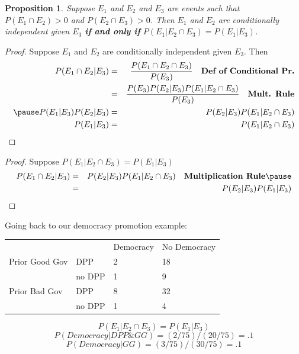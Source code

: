 \documentclass[aspectratio=169]{beamer}
\newtheorem{prop}{Proposition}
\numberwithin{equation}{section}
\begin{document}
\begin{frame}

\begin{prop}
Suppose $E_{1}$ and $E_{2}$ and $E_{3}$ are events such that $P(E_{1} \cap E_{2})>0$ and $P(E_{2} \cap E_{3}) >0$.  Then $E_{1}$ and $E_{2}$ are conditionally independent given $E_{3} $ \textbf{if and only if} $P(E_{1} | E_{2} \cap E_{3})  = P(E_{1} | E_{3}) $.  
\end{prop} \pause

\begin{proof}
Suppose $E_{1}$ and $E_{2}$ are conditionally independent given $E_{3}$.  Then 
\begin{eqnarray}
P(E_{1} \cap E_{2} |  E_{3}) & = & \frac{P(E_{1} \cap E_{2} \cap E_{3}  ) }{P(E_{3} )}  \quad \textbf{Def of Conditional Pr.}\nonumber \\
& = & \frac{P(E_{3})P(E_{2} | E_{3} )P(E_{1} | E_{2} \cap E_{3} ) }{ P(E_{3} )}  \quad \textbf{Mult. Rule} \nonumber \\\pause
P(E_{1}|E_{3}) P(E_{2} | E_{3} ) & = & P(E_{2} | E_{3} )P(E_{1} | E_{2} \cap E_{3} ) \nonumber \\
P(E_{1}|E_{3}) & = & P(E_{1} | E_{2} \cap E_{3} ) \nonumber 
\end{eqnarray}

\end{proof}





\end{frame}

\begin{frame}

\begin{proof}
Suppose $P(E_{1} | E_{2} \cap E_{3})  = P(E_{1} | E_{3}) $
\pause
\begin{eqnarray}
P(E_{1} \cap E_{2}| E_{3 } ) & = & P(E_{2} | E_{3} ) P(E_{1} | E_{2}\cap E_{3} ) \quad \textbf{Multiplication Rule}\nonumber \pause\\
 & = & P(E_{2} | E_{3} ) P(E_{1} | E_{3} ) \nonumber 
\end{eqnarray}

\end{proof}

\end{frame}




\begin{frame}
Going back to our democracy promotion example:
\begin{table}
\begin{tabular}{llll}
		&&Democracy& No Democracy\\
 Prior Good Gov & DPP &2 & 18\\
		 &no DPP & 1& 9\\
		 \hline
Prior Bad Gov  & DPP &8 & 32\\
		&no DPP & 1& 4\\
\end{tabular}
\end{table}\pause

$$P(E_{1} | E_{2} \cap E_{3})  = P(E_{1} | E_{3}) $$ 
$$P(Democracy| DPP\& GG) = (2/75)/(20/75)=.1$$
$$P(Democracy| GG) = (3/75)/(30/75)=.1$$

\end{frame}
\end{document}
